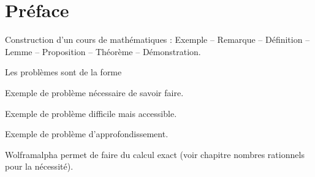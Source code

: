 
\chapter*{Préface}

Construction d'un cours de mathématiques : Exemple -- Remarque -- Définition -- Lemme -- Proposition -- Théorème -- Démonstration.

Les problèmes sont de la forme
\begin{Exercise}[counter=preface]
	Exemple de problème nécessaire de savoir faire.
\end{Exercise}
\begin{Exercise}[difficulty=1, counter=preface]
	Exemple de problème difficile mais accessible.
\end{Exercise}
\begin{Exercise}[difficulty=2, counter=preface]
	Exemple de problème d'approfondissement.
\end{Exercise}


Wolframalpha permet de faire du calcul exact (voir chapitre nombres rationnels pour la nécessité).